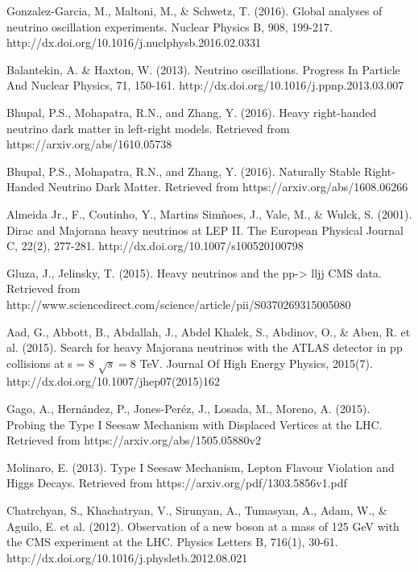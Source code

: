 \documentclass[11pt]{book}
\begin{document}
\begin{thebibliography}{10}


 Gonzalez-Garcia, M., Maltoni, M., \& Schwetz, T. (2016). Global analyses of neutrino oscillation experiments. Nuclear Physics B, 908, 199-217. http://dx.doi.org/10.1016/j.nuclphysb.2016.02.0331

 Balantekin, A. \& Haxton, W. (2013). Neutrino oscillations. Progress In Particle And Nuclear Physics, 71, 150-161. http://dx.doi.org/10.1016/j.ppnp.2013.03.007   
 
 Bhupal, P.S., Mohapatra, R.N., and Zhang, Y. (2016). Heavy right-handed neutrino dark matter in left-right models. Retrieved from https://arxiv.org/abs/1610.05738     

 Bhupal, P.S., Mohapatra, R.N., and Zhang, Y. (2016). Naturally Stable Right-Handed Neutrino Dark Matter. Retrieved from https://arxiv.org/abs/1608.06266

 Almeida Jr., F., Coutinho, Y., Martins Simñoes, J., Vale, M., \& Wulck, S. (2001). Dirac and Majorana heavy neutrinos at LEP II. The European Physical Journal C, 22(2), 277-281. http://dx.doi.org/10.1007/s100520100798  

  Gluza, J., Jelinsky, T. (2015). Heavy neutrinos and the pp-> lljj CMS data. Retrieved from http://www.sciencedirect.com/science/article/pii/S0370269315005080 

 Aad, G., Abbott, B., Abdallah, J., Abdel Khalek, S., Abdinov, O., \& Aben, R. et al. (2015). Search for heavy Majorana neutrinos with the ATLAS detector in pp collisions at s = 8 $ \sqrt{s}=8 $ TeV. Journal Of High Energy Physics, 2015(7). http://dx.doi.org/10.1007/jhep07(2015)162  

 Gago, A., Hernández, P., Jones-Peréz, J., Losada, M., Moreno, A. (2015). Probing the Type I Seesaw Mechanism with Displaced Vertices at the LHC. Retrieved from  https://arxiv.org/abs/1505.05880v2

 Molinaro, E. (2013). Type I Seesaw Mechanism, Lepton Flavour    	Violation and                                                                                                       Higgs Decays. Retrieved from https://arxiv.org/pdf/1303.5856v1.pdf

 Chatrchyan, S., Khachatryan, V., Sirunyan, A., Tumasyan, A., Adam, W., \& Aguilo, E. et al. (2012). Observation of a new boson at a mass of 125 GeV with the CMS experiment at the LHC. Physics Letters B, 716(1), 30-61. http://dx.doi.org/10.1016/j.physletb.2012.08.021


\end{thebibliography}
\end{document}
